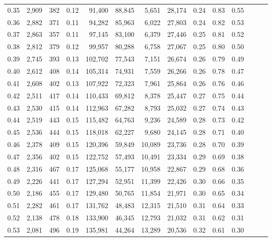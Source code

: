 \begin{tabular}{rrrrrrrrrrrrrr}
0.35 &  2,909 &  382 &  0.12 &   91,400 &   88,845 &   5,651 &  28,174 &  0.24 &  0.83 &      0.55 \\
0.36 &  2,882 &  371 &  0.11 &   94,282 &   85,963 &   6,022 &  27,803 &  0.24 &  0.82 &      0.53 \\
0.37 &  2,863 &  357 &  0.11 &   97,145 &   83,100 &   6,379 &  27,446 &  0.25 &  0.81 &      0.52 \\
0.38 &  2,812 &  379 &  0.12 &   99,957 &   80,288 &   6,758 &  27,067 &  0.25 &  0.80 &      0.50 \\
0.39 &  2,745 &  393 &  0.13 &  102,702 &   77,543 &   7,151 &  26,674 &  0.26 &  0.79 &      0.49 \\
0.40 &  2,612 &  408 &  0.14 &  105,314 &   74,931 &   7,559 &  26,266 &  0.26 &  0.78 &      0.47 \\
0.41 &  2,608 &  402 &  0.13 &  107,922 &   72,323 &   7,961 &  25,864 &  0.26 &  0.76 &      0.46 \\
0.42 &  2,511 &  417 &  0.14 &  110,433 &   69,812 &   8,378 &  25,447 &  0.27 &  0.75 &      0.44 \\
0.43 &  2,530 &  415 &  0.14 &  112,963 &   67,282 &   8,793 &  25,032 &  0.27 &  0.74 &      0.43 \\
0.44 &  2,519 &  443 &  0.15 &  115,482 &   64,763 &   9,236 &  24,589 &  0.28 &  0.73 &      0.42 \\
0.45 &  2,536 &  444 &  0.15 &  118,018 &   62,227 &   9,680 &  24,145 &  0.28 &  0.71 &      0.40 \\
0.46 &  2,378 &  409 &  0.15 &  120,396 &   59,849 &  10,089 &  23,736 &  0.28 &  0.70 &      0.39 \\
0.47 &  2,356 &  402 &  0.15 &  122,752 &   57,493 &  10,491 &  23,334 &  0.29 &  0.69 &      0.38 \\
0.48 &  2,316 &  467 &  0.17 &  125,068 &   55,177 &  10,958 &  22,867 &  0.29 &  0.68 &      0.36 \\
0.49 &  2,226 &  441 &  0.17 &  127,294 &   52,951 &  11,399 &  22,426 &  0.30 &  0.66 &      0.35 \\
0.50 &  2,186 &  455 &  0.17 &  129,480 &   50,765 &  11,854 &  21,971 &  0.30 &  0.65 &      0.34 \\
0.51 &  2,282 &  461 &  0.17 &  131,762 &   48,483 &  12,315 &  21,510 &  0.31 &  0.64 &      0.33 \\
0.52 &  2,138 &  478 &  0.18 &  133,900 &   46,345 &  12,793 &  21,032 &  0.31 &  0.62 &      0.31 \\
0.53 &  2,081 &  496 &  0.19 &  135,981 &   44,264 &  13,289 &  20,536 &  0.32 &  0.61 &      0.30 \\

\end{tabular}
